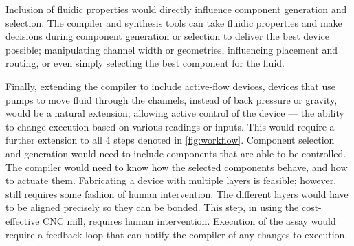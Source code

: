 Inclusion of fluidic properties would directly influence component generation and selection.
The compiler and synthesis tools can take fluidic properties and make decisions during component generation or selection to deliver the best device possible; manipulating channel width or geometries, influencing placement and routing, or even simply selecting the best component for the fluid.

Finally, extending the compiler to include active-flow devices, devices that use pumps to move fluid through the channels, instead of back pressure or gravity, would be a natural extension; allowing active control of the device --- the ability to change execution based on various readings or inputs.
This would require a further extension to all 4 steps denoted in \cref{fig:workflow}.
Component selection and generation would need to include components that are able to be controlled.
The compiler would need to know how the selected components behave, and how to actuate them.
Fabricating a device with multiple layers is feasible; however, still requires some fashion of human intervention.
The different layers would have to be aligned precisely so they can be bonded.
This step, in using the cost-effective CNC mill, requires human intervention.
Execution of the assay would require a feedback loop that can notify the compiler of any changes to execution.
